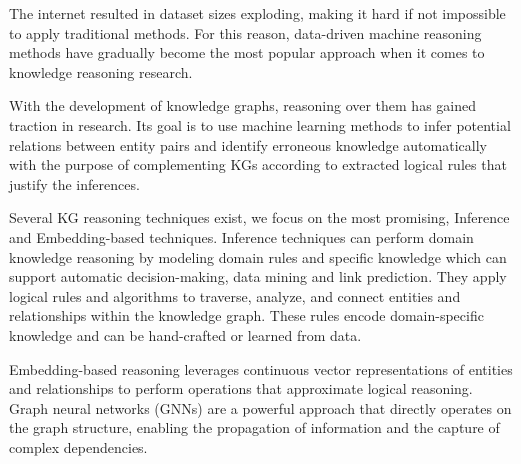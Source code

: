 The internet resulted in dataset sizes exploding, making it hard if not impossible to apply traditional methods. For this reason, data-driven machine reasoning methods have gradually become the most popular approach when it comes to knowledge reasoning research.

With the development of knowledge graphs, reasoning over them has gained traction in research. Its goal is to use machine learning methods to infer potential relations between entity pairs and identify erroneous knowledge automatically with the purpose of complementing KGs according to extracted logical rules that justify the inferences.




Several KG reasoning techniques exist, we focus on the most promising, Inference and Embedding-based techniques. Inference techniques can perform domain knowledge reasoning by modeling domain rules and specific knowledge which can support automatic decision-making, data mining and link prediction. They apply logical rules and algorithms to traverse, analyze, and connect entities and relationships within the knowledge graph. These rules encode domain-specific knowledge and can be hand-crafted or learned from data.


Embedding-based reasoning leverages continuous vector representations of entities and relationships to perform operations that approximate logical reasoning. Graph neural networks (GNNs) \cite{sola2023deep} are a powerful approach that directly operates on the graph structure, enabling the propagation of information and the capture of complex dependencies.


